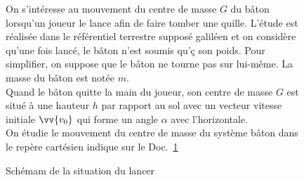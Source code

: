 \documentclass[a4paper,11pt,fleqn]{article}%
\begin{document}
\begin{figure}[h!]
\begin{minipage}{.6\linewidth}
    On s'intéresse au mouvement du centre de masse $G$ du bâton lorsqu'un joueur le lance afin de faire tomber une quille. L'étude est réalisée dans le référentiel terrestre supposé galiléen et on considère qu'une fois lancé, le bâton n'est soumis qu'ç son poids. Pour simplifier, on suppose que le bâton ne tourne pas sur lui-même. La masse du bâton est notée $m$.\\
    Quand le bâton quitte la main du joueur, son centre de masse $G$ est situé à une hauteur $h$ par rapport au sol avec un vecteur vitesse initiale $\vv{v_0}$ qui forme un angle $\alpha$ avec l'horizontale.\\
    On étudie le mouvement du centre de masse du système {bâton} dans le repère cartésien indique sur le Doc.~\ref{doc1}    
\end{minipage}
\begin{minipage}{.38\linewidth}
    \caption{Schémam de la situation du lancer}
    \label{doc1}
    \centering
\end{minipage}
\end{figure}
\end{document}
